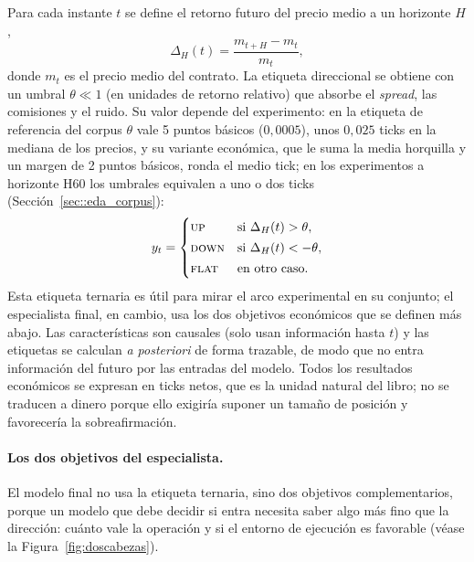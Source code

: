 Para cada instante $t$ se define el retorno futuro del precio medio a un horizonte $H$,
\begin{equation}
\Delta_H (t) = \frac{m_{t+H} - m_t}{m_t},
\end{equation}
donde $m_t$ es el precio medio del contrato. La etiqueta direccional se obtiene con un
umbral $\theta \ll 1$ (en unidades de retorno relativo) que absorbe el \emph{spread}, las
comisiones y el ruido. Su valor depende del experimento: en la etiqueta de referencia del
corpus $\theta$ vale 5 puntos básicos ($0{,}0005$), unos $0{,}025$ ticks en la mediana de
los precios, y su variante económica, que le suma la media horquilla y un margen de 2
puntos básicos, ronda el medio tick; en los experimentos a horizonte H60 los umbrales
equivalen a uno o dos ticks (Sección~\ref{sec::eda_corpus}):
\begin{equation}
y_t = \begin{cases}
\textsc{up} & \text{si } \Delta_H (t) > \theta,\\[2pt]
\textsc{down} & \text{si } \Delta_H (t) < -\theta,\\[2pt]
\textsc{flat} & \text{en otro caso.}
\end{cases}
\end{equation}
Esta etiqueta ternaria es útil para mirar el arco experimental en su conjunto; el
especialista final, en cambio, usa los dos objetivos económicos que se definen más abajo.
Las características son causales (solo usan información hasta
$t$) y las etiquetas se calculan \emph{a posteriori} de forma trazable, de modo que no
entra información del futuro por las entradas del modelo. Todos los resultados económicos se
expresan en ticks netos, que es la unidad natural del libro; no se traducen a dinero porque
ello exigiría suponer un tamaño de posición y favorecería la sobreafirmación.

\paragraph{Los dos objetivos del especialista.} El modelo final no usa la etiqueta ternaria,
sino dos objetivos complementarios, porque un modelo que debe decidir si entra necesita
saber algo más fino que la dirección: cuánto vale la operación y si el entorno de ejecución
es favorable (véase la Figura~\ref{fig:doscabezas}).

